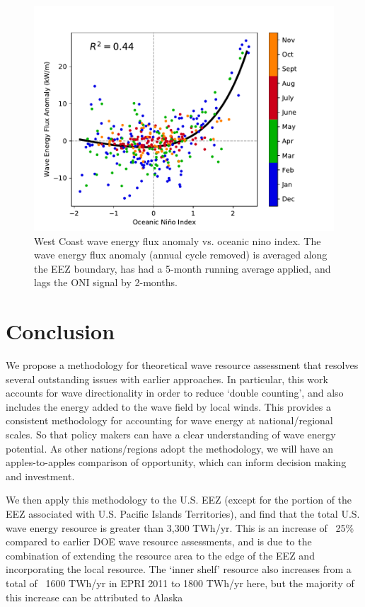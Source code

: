 \begin{figure}[ht]
  \centering
  \includegraphics[width=\textwidth]{../fig/ENSO-Comparison.wc.pdf}
  \caption{West Coast wave energy flux anomaly vs. oceanic nino index. The wave energy flux anomaly (annual cycle removed) is averaged along the EEZ boundary, has had a 5-month running average applied, and lags the ONI signal by 2-months.}
  \label{fig:wc-nino}
\end{figure}


\section{Conclusion} \label{sec:conclusion}

We propose a methodology for theoretical wave resource assessment that resolves several outstanding issues with earlier approaches. In particular, this work accounts for wave directionality in order to reduce `double counting', and also includes the energy added to the wave field by local winds. This provides a consistent methodology for accounting for wave energy at national/regional scales. So that policy makers can have a clear understanding of wave energy potential. As other nations/regions adopt the methodology, we will have an apples-to-apples comparison of opportunity, which can inform decision making and investment.

We then apply this methodology to the U.S. EEZ (except for the portion of the EEZ associated with U.S. Pacific Islands Territories), and find that the total U.S. wave energy resource is greater than 3,300 TWh/yr.
This is an increase of ~25\% compared to earlier DOE wave resource assessments, and is due to the combination of extending the resource area to the edge of the EEZ and incorporating the local resource. The `inner shelf' resource also increases from a total of ~1600 TWh/yr in EPRI 2011 to 1800 TWh/yr here, but the majority of this increase can be attributed to Alaska 

